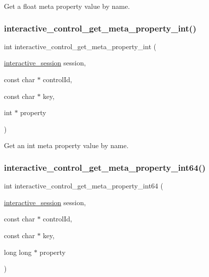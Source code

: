 Get a {\ttfamily float} meta property value by name. 

\mbox{\label{group___interactivity_ga5c0a82e73aa86d78d64dcd2e899def55}} 
\subsubsection{\texorpdfstring{interactive\+\_\+control\+\_\+get\+\_\+meta\+\_\+property\+\_\+int()}{interactive\_control\_get\_meta\_property\_int()}}
{\footnotesize\ttfamily int interactive\+\_\+control\+\_\+get\+\_\+meta\+\_\+property\+\_\+int (\begin{DoxyParamCaption}\item[{\mbox{\hyperlink{group___interactivity_ga6d8819d38b8dc8994a2299cf22a65a31}{interactive\+\_\+session}}}]{session,  }\item[{const char $\ast$}]{control\+Id,  }\item[{const char $\ast$}]{key,  }\item[{int $\ast$}]{property }\end{DoxyParamCaption})}



Get an {\ttfamily int} meta property value by name. 

\mbox{\label{group___interactivity_ga18c08c14894dfe7dc3ef7b5d541aac60}} 
\subsubsection{\texorpdfstring{interactive\+\_\+control\+\_\+get\+\_\+meta\+\_\+property\+\_\+int64()}{interactive\_control\_get\_meta\_property\_int64()}}
{\footnotesize\ttfamily int interactive\+\_\+control\+\_\+get\+\_\+meta\+\_\+property\+\_\+int64 (\begin{DoxyParamCaption}\item[{\mbox{\hyperlink{group___interactivity_ga6d8819d38b8dc8994a2299cf22a65a31}{interactive\+\_\+session}}}]{session,  }\item[{const char $\ast$}]{control\+Id,  }\item[{const char $\ast$}]{key,  }\item[{long long $\ast$}]{property }\end{DoxyParamCaption})}



